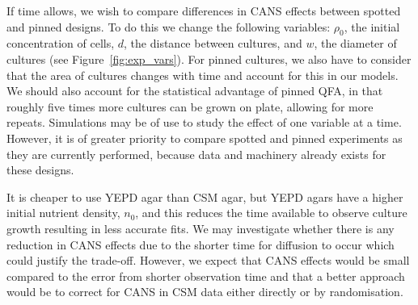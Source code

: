 If time allows, we wish to compare differences in CANS effects between
spotted and pinned designs. To do this we change the following
variables: \(\rho_{0}\), the initial concentration of cells, \(d\),
the distance between cultures, and \(w\), the diameter of cultures
(see Figure~\ref{fig:exp_vars}). For pinned cultures, we also have to
consider that the area of cultures changes with time and account for
this in our models. We should also account for the statistical
advantage of pinned QFA, in that roughly five times more cultures can
be grown on plate, allowing for more repeats. Simulations may be of
use to study the effect of one variable at a time. However, it is of
greater priority to compare spotted and pinned experiments as they are
currently performed, because data and machinery already exists for
these designs.

It is cheaper to use YEPD agar than CSM agar, but YEPD agars have a
higher initial nutrient density, \(n_{0}\), and this reduces the time
available to observe culture growth resulting in less accurate
fits. We may investigate whether there is any reduction in CANS
effects due to the shorter time for diffusion to occur which could
justify the trade-off. However, we expect that CANS effects would be
small compared to the error from shorter observation time and that a
better approach would be to correct for CANS in CSM data either
directly or by randomisation.


